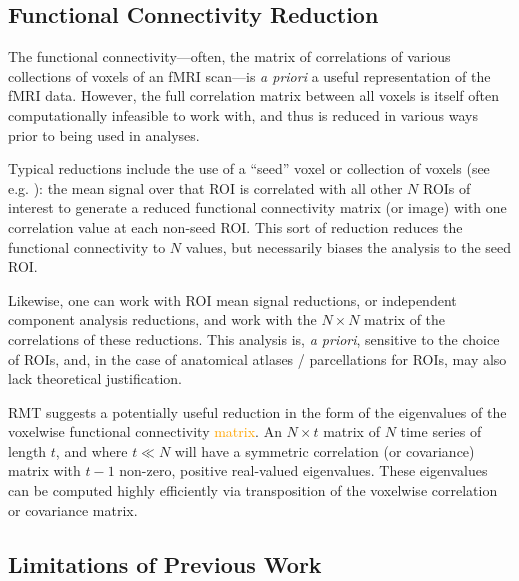 \documentclass[12pt]{spieman}  %
\begin{document}
\begin{spacing}{2}
\subsection{Functional Connectivity Reduction}

The functional connectivity—often, the matrix of correlations of
various collections of voxels of an fMRI scan—is \textit{a priori} a useful
representation of the fMRI data. However, the full correlation matrix between
all voxels is itself often computationally infeasible to work with, and thus is
reduced in various ways prior to being used in analyses.

Typical reductions include the use of a ``seed'' voxel or collection of voxels
(see e.g. ): the mean signal over that ROI
is correlated with all other \(N\) ROIs of interest to generate a reduced
functional connectivity matrix (or image) with one correlation value at each
non-seed ROI. This sort of reduction reduces the functional connectivity to
\(N\) values, but necessarily biases the analysis to the seed ROI.

Likewise, one can work with ROI mean signal reductions, or independent
component analysis reductions\cite{joelRelationshipSeedbasedICAbased2011,
smithCharacterizingIndividualDifferences2014}, and work with the \(N \times N\)
matrix of the correlations of these reductions. This analysis is, \textit{a
priori}, sensitive to the choice of ROIs, and, in the case of anatomical
atlases / parcellations for ROIs, may also lack theoretical justification.

RMT suggests a potentially useful reduction in the form of the eigenvalues of
the voxelwise functional connectivity \textcolor{orange}{matrix}. An \(N \times
t\) matrix of \(N\) time series of length \(t\), and where \(t \ll N\) will
have a symmetric correlation (or covariance) matrix with \(t - 1\) non-zero,
positive real-valued eigenvalues. These eigenvalues can be computed highly
efficiently via transposition of the voxelwise correlation or covariance
matrix.

\subsection{Limitations of Previous Work}


\end{spacing}
\end{document}
